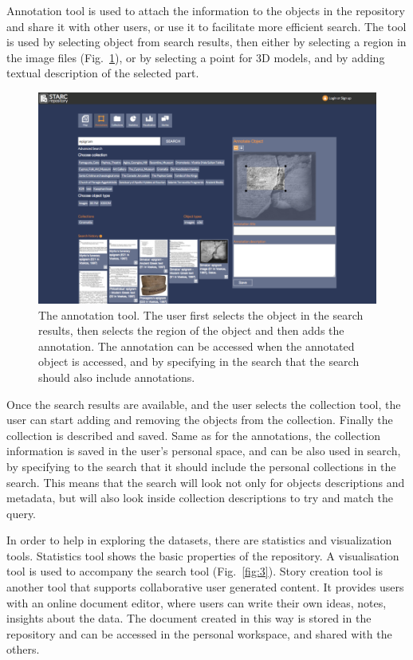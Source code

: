 \documentclass[amsthm,ebook]{saparticle}
\begin{document}
Annotation tool is used to attach the information to the objects in the repository and share it with other users, or use
it to facilitate more efficient search. The tool is used by selecting object from search results, then either by
selecting a region in the image files (Fig.~\ref{fig:2}), or by selecting a point for 3D models, and by adding textual description
of the selected part. 

\begin{figure}[!bp]
\centering
 \includegraphics[width=\columnwidth]{DamnjanovicetalEAGLE2016-img002.png}
\caption{The annotation tool. The user first selects the object in the search results, then selects the region of the
object and then adds the annotation. The annotation can be accessed when the annotated object is accessed, and by
specifying in the search that the search should also include annotations. }
\label{fig:2}
\end{figure}

Once the search results are available, and the user selects the collection tool, the user can start adding and removing
the objects from the collection. Finally the collection is described and saved. Same as for the annotations, the
collection information is saved in the user’s personal space, and can be also used in search, by specifying to the
search that it should include the personal collections in the search. This means that the search will look not only for
objects descriptions and metadata, but will also look inside collection descriptions to try and match the query. 

In order to help in exploring the datasets, there are statistics and visualization tools. Statistics tool shows the
basic properties of the repository. A visualisation tool is used to accompany the search tool (Fig.~\ref{fig:3}). Story creation
tool is another tool that supports collaborative user generated content. It provides users with an online document
editor, where users can write their own ideas, notes, insights about the data. The document created in this way is
stored in the repository and can be accessed in the personal workspace, and shared with the others. 
\end{document}
